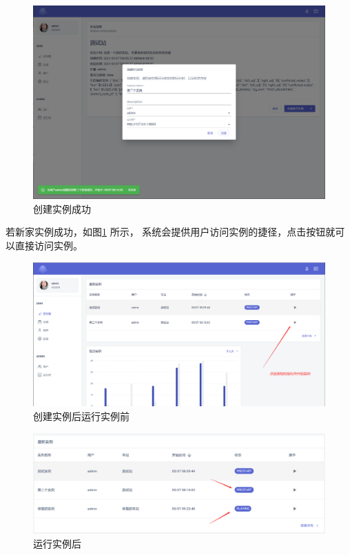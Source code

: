 \begin{figure}[htbp!]
  \centering
  \includegraphics[width=\textwidth]{figures/png/dialog_succ.png}
  \caption{\label{dialog_succ}创建实例成功}
\end{figure}

若新家实例成功，如图\ref{dialog_succ} 所示，
系统会提供用户访问实例的捷径，点击按钮就可以直接访问实例。

\begin{figure}[htbp!]
  \centering
  \includegraphics[width=\textwidth]{figures/png/after_create.png}
  \caption{\label{after_create}创建实例后运行实例前}
\end{figure}


\begin{figure}[htbp!]
  \centering
  \includegraphics[width=\textwidth]{figures/png/3rd.png}
  \caption{\label{3rd}运行实例后}
\end{figure}

